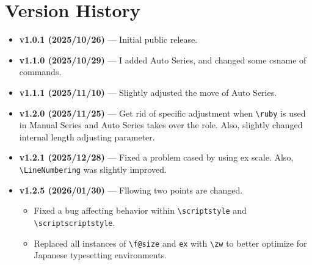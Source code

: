 \documentclass[luatex,fontsize=8pt,paper=b5,twoside]{jlreq}%
\begin{document}
\section{Version History}
\begin{itemize}
  \item \textbf{v1.0.1 (2025/10/26)} --- Initial public release.
  \item \textbf{v1.1.0 (2025/10/29)} --- I added Auto Series, and changed some csname of commands.
  \item \textbf{v1.1.1 (2025/11/10)} --- Slightly adjusted the move of Auto Series.
  \item \textbf{v1.2.0 (2025/11/25)} --- Get rid of specific adjustment when \verb|\ruby| is used in Manual Series and Auto Series takes over the role. Also, slightly changed internal length adjusting parameter.
  \item \textbf{v1.2.1 (2025/12/28)} --- Fixed a problem cased by using ex scale. Also, \verb|\LineNumbering| was slightly improved.
  \item \textbf{v1.2.5 (2026/01/30)} --- Fllowing two points are changed.
    \begin{itemize}
      \item Fixed a bug affecting behavior within \verb|\scriptstyle| and \verb|\scriptscriptstyle|.
      \item Replaced all instances of \verb|\f@size| and \verb|ex| with \verb|\zw| to better optimize for Japanese typesetting environments.
    \end{itemize}
\end{itemize}
\end{document}
